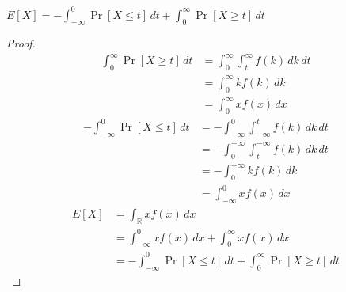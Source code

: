$E[X]=-\int_{-\infty}^{0}\Pr[X\le t]\, dt+\int_{0}^{\infty}\Pr[X\ge t]\, dt$
\begin{proof}
\begin{align}
    \nonumber \int_{0}^{\infty}\Pr[X\ge t]\, dt &=\int_{0}^{\infty}
    \int_{t}^{\infty}f(k)\, dk
    \, dt\\
    \nonumber&=\int_{0}^{\infty}
    kf(k)
    \, dk\\
    \nonumber&=\int_{0}^{\infty}
    xf(x)
    \, dx
\end{align}
\begin{align}
    \nonumber -\int_{-\infty}^{0}\Pr[X\le t]\, dt &=-\int_{-\infty}^{0}
    \int_{-\infty}^{t}f(k)\, dk
    \, dt\\
    \nonumber&=-\int_{0}^{-\infty}
   \int_{t}^{-\infty}f(k)\, dk
    \, dt\\
    \nonumber&=-\int_{0}^{-\infty}
    kf(k)
    \, dk\\
    \nonumber&=\int_{-\infty}^{0}
    xf(x)
    \, dx
\end{align}
\begin{align}
    \nonumber E[X]&=\int_{\mathbb{R}}xf(x)\, dx\\
    \nonumber &=\int_{-\infty}^{0}xf(x)\, dx+\int_{0}^{\infty}xf(x)\, dx\\
    \nonumber &=-\int_{-\infty}^{0}\Pr[X\le t]\, dt + \int_{0}^{\infty}\Pr[X\ge t]\, dt
\end{align}
\end{proof}